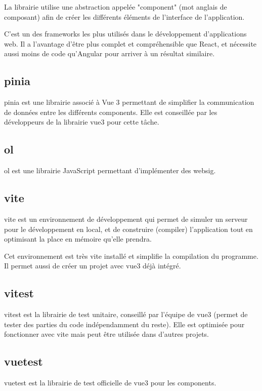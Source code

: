 \documentclass[
    iai, %
    il, %
]{heig-tb}
\begin{document}
La librairie utilise une abstraction appelée "component" (mot anglais de composant) afin de créer les différents éléments de l'interface de l'application.

C'est un des frameworks les plus utilisés dans le développement d'applications web.
Il a l'avantage d'être plus complet et compréhensible que React, et nécessite aussi moins de code qu'Angular pour arriver à un résultat similaire.

\subsection{\gls{pinia}}
\gls{pinia} est une librairie associé à Vue 3 permettant de simplifier la communication de données entre les différents components.
Elle est conseillée par les développeurs de la librairie \gls{vue3} pour cette tâche.

\subsection{\gls{ol}}
\gls{ol} est une librairie JavaScript permettant d'implémenter des \gls{websig}.

\subsection{\gls{vite}}
\gls{vite} est un environnement de développement qui permet de simuler un serveur pour le développement en local,
et de construire (compiler) l'application tout en optimisant la place en mémoire qu'elle prendra.

Cet environnement est très vite installé et simplifie la compilation du programme.
Il permet aussi de créer un projet avec \gls{vue3} déjà intégré.

\subsection{\gls{vitest}}
\gls{vitest} est la librairie de test unitaire, conseillé par l'équipe de \gls{vue3} (permet de tester des parties du code indépendamment du reste).
Elle est optimisée pour fonctionner avec \gls{vite} mais peut être utilisée dans d'autres projets.

\subsection{\gls{vuetest}}
\gls{vuetest} est la librairie de test officielle de \gls{vue3} pour les components.
\end{document}

